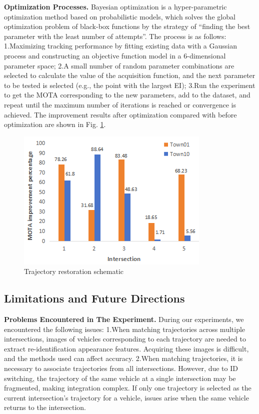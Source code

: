 \documentclass[lettersize,journal]{IEEEtran}
\begin{document}
\textbf{Optimization Processes.}
Bayesian optimization is a hyper-parametric optimization method based on probabilistic models, which solves the global optimization problem of black-box functions by the strategy of “finding the best parameter with the least number of attempts”.
The process is as follows:
1.Maximizing tracking performance by fitting existing data with a Gaussian process and constructing an objective function model in a 6-dimensional parameter space; 
2.A small number of random parameter combinations are selected to calculate the value of the acquisition function, and the next parameter to be tested is selected (e.g., the point with the largest EI); 
3.Run the experiment to get the MOTA corresponding to the new parameters, add to the dataset, and repeat until the maximum number of iterations is reached or convergence is achieved.
The improvement results after optimization compared with before optimization are shown in Fig. \ref{fig:4}.   
\begin{figure}[t]
	\centering
	\includegraphics[width=\linewidth]{picture/picture4.png} 
	\caption{Trajectory restoration schematic} 
	\label{fig:4} 
\end{figure}

\subsection{Limitations and Future Directions}

\textbf{Problems Encountered in The Experiment.}
During our experiments, we encountered the following issues:  
1.When matching trajectories across multiple intersections, images of vehicles corresponding to each trajectory are needed to extract re-identification appearance features. 
Acquiring these images is difficult, and the methods used can affect accuracy.  
2.When matching trajectories, it is necessary to associate trajectories from all intersections. 
However, due to ID switching, the trajectory of the same vehicle at a single intersection may be fragmented, making integration complex. 
If only one trajectory is selected as the current intersection's trajectory for a vehicle, issues arise when the same vehicle returns to the intersection.
\end{document}
